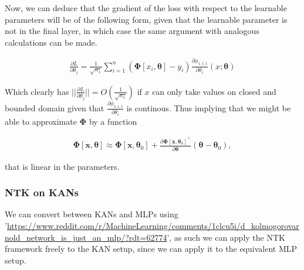 \documentclass{article}
\begin{document}
Now, we can deduce that the gradient of the loss with respect to the learnable parameters will be of the following form, given that 
the learnable parameter is not in the final layer, in which case the same argument with analogous calculations can be made.

\begin{align}
    \frac{\partial L}{\partial \theta_j} = \frac{1}{\sqrt{n_1}} \sum_{i=1}^{n}\left(\mathbf{\Phi}[x_i, \mathbf{\theta}] - y_i\right) \frac{\partial \phi_{1,i,1}}{\partial \theta_i}(x; \mathbf{\theta}) 
\end{align}

Which clearly has $||\frac{\partial L}{\partial \theta_j}|| = O(\frac{1}{\sqrt{n_1}})$ if $x$ can only take values on closed and bounded 
domain given that $\frac{\partial \phi_{1,i,1}}{\partial \theta_i}$ is continous.
Thus implying that we might be able to approximate $\mathbf{\Phi}$ by a function

\begin{align}
    \mathbf{\Phi}[\mathbf{x}, \mathbf{\theta}] \approx \mathbf{\Phi}[\mathbf{x}, \mathbf{\theta}_{0}] 
    + \frac{\partial \mathbf{\Phi}[\mathbf{x}, \mathbf{\theta}_{0}]^{\intercal}}{\partial \mathbf{\theta}}(\mathbf{\theta} - \mathbf{\theta}_0),
\end{align}

that is linear in the parameters.

\subsubsection{NTK on KANs}
We can convert between KANs and MLPs using '\url{https://www.reddit.com/r/MachineLearning/comments/1clcu5i/d_kolmogorovarnold_network_is_just_an_mlp/?rdt=62774}',
as such we can apply the NTK framework freely to the KAN setup, since we can apply it to the equivalent MLP setup.








\end{document}
